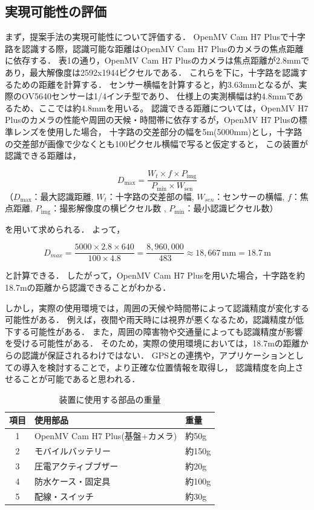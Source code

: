 \documentclass[uplatex,dvipdfmx]{jsarticle}
\begin{document}
\subsection{実現可能性の評価}
\indent
まず，提案手法の実現可能性について評価する．
OpenMV Cam H7 Plusで十字路を認識する際，認識可能な距離はOpenMV Cam H7 Plusのカメラの焦点距離に依存する．
表1の通り，OpenMV Cam H7 Plusのカメラは焦点距離が2.8mmであり，最大解像度は2592x1944ピクセルである．
これらを下に，十字路を認識するための距離を計算する．
センサー横幅を計算すると，約3.63mmとなるが、実際のOV5640センサーは1/4インチ型であり、
仕様上の実測横幅は約4.8mmであるため、ここでは約4.8mmを用いる。
認識できる距離については，OpenMV H7 Plusのカメラの性能や周囲の天候・時間帯に依存するが，OpenMV H7 Plusの標準レンズを使用した場合，
十字路の交差部分の幅を5m(5000mm)とし，十字路の交差部が画像で少なくとも100ピクセル横幅で写ると仮定すると，
この装置が認識できる距離は，

\[
D_{\text{max}} = \frac{W_t × f × P_{\text{img}}}{P_{\text{min}} × W_{\text{sen}}}
\]
\hspace{1cm}（$D_{\text{max}}$：最大認識距離, $W_t$：十字路の交差部の幅, $W_{sen}$：センサーの横幅, $f$：焦点距離, $P_{\text{img}}$：撮影解像度の横ピクセル数
, $P_{\text{min}}$：最小認識ピクセル数）

\vspace{1cm}

を用いて求められる．\cite{ref:kyori}
よって，


\[
D_{max} = \frac{5000 \times 2.8 \times 640}{100 \times 4.8} = \frac{8{,}960{,}000}{483} \approx 18{,}667\,\mathrm{mm} = {18.7\,\mathrm{m}}
\]

\vspace{1cm}
と計算できる．
したがって，OpenMV Cam H7 Plusを用いた場合，十字路を約18.7mの距離から認識できることがわかる．
\par
しかし，実際の使用環境では，周囲の天候や時間帯によって認識精度が変化する可能性がある．
例えば，夜間や雨天時には視界が悪くなるため，認識精度が低下する可能性がある．
また，周囲の障害物や交通量によっても認識精度が影響を受ける可能性がある．
そのため，実際の使用環境においては，18.7mの距離からの認識が保証されるわけではない．
GPSとの連携や，アプリケーションとしての導入を検討することで，より正確な位置情報を取得し，
認識精度を向上させることが可能であると思われる．
\par
\begin{table}[h]
  \centering
  \caption{装置に使用する部品の重量}
  \label{tab:parts}
  \begin{tabular}{|c|l|l|}
    \hline
    項目 & 使用部品 & 重量\\ \hline
    1 & OpenMV Cam H7 Plus(基盤+カメラ) & 約50g\\ \hline
    2 & モバイルバッテリー & 約150g\\ \hline
    3 & 圧電アクティブブザー & 約20g\\ \hline
    4 & 防水ケース・固定具 & 約100g\\ \hline
    5 & 配線・スイッチ & 約30g\\ \hline
  \end{tabular}
\end{table}
\end{document}
